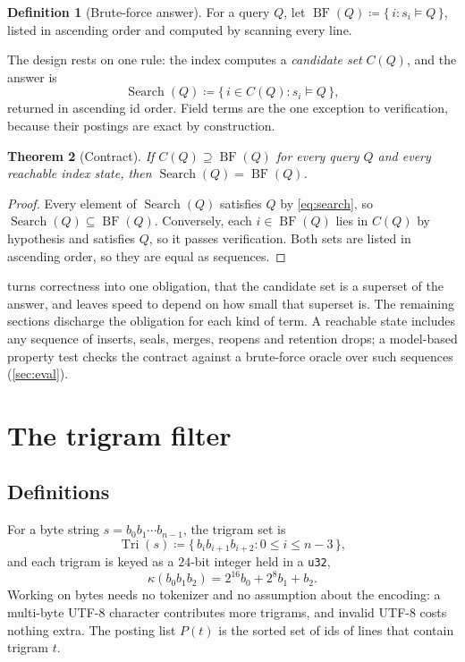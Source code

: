 \documentclass[11pt]{article}
\theoremstyle{plain}
\newtheorem{theorem}{Theorem}[section]
\theoremstyle{definition}
\newtheorem{definition}[theorem]{Definition}
\theoremstyle{remark}
\newcommand{\Tri}{\operatorname{Tri}}
\newcommand{\BF}{\operatorname{BF}}
\newcommand{\Search}{\operatorname{Search}}
\newcommand{\code}[1]{\texttt{#1}}
\begin{document}
\begin{definition}[Brute-force answer]\label{def:bf}
For a query $Q$, let $\BF(Q) \coloneqq \{\, i : s_i \models Q \,\}$, listed in
ascending order and computed by scanning every line.
\end{definition}

The design rests on one rule: the index computes a \emph{candidate set}
$C(Q)$, and the answer is
\begin{equation}\label{eq:search}
  \Search(Q) \coloneqq \{\, i \in C(Q) : s_i \models Q \,\},
\end{equation}
returned in ascending id order. Field terms are the one exception to
verification, because their postings are exact by construction.

\begin{theorem}[Contract]\label{thm:contract}
If $C(Q) \supseteq \BF(Q)$ for every query $Q$ and every reachable index state,
then $\Search(Q) = \BF(Q)$.
\end{theorem}

\begin{proof}
Every element of $\Search(Q)$ satisfies $Q$ by \cref{eq:search}, so
$\Search(Q) \subseteq \BF(Q)$. Conversely, each $i \in \BF(Q)$ lies in $C(Q)$ by
hypothesis and satisfies $Q$, so it passes verification. Both sets are listed in
ascending order, so they are equal as sequences.
\end{proof}

 turns correctness into one obligation, that the candidate
set is a superset of the answer, and leaves speed to depend on how small that
superset is. The remaining sections discharge the obligation for each kind of
term. A reachable state includes any sequence of inserts, seals, merges,
reopens and retention drops; a model-based property test checks the contract
against a brute-force oracle over such sequences (\cref{sec:eval}).

\section{The trigram filter}\label{sec:trigram}

\subsection{Definitions}

For a byte string $s = b_0 b_1 \cdots b_{n-1}$, the trigram set is
\begin{equation}
  \Tri(s) \coloneqq \{\, b_i b_{i+1} b_{i+2} : 0 \le i \le n - 3 \,\},
\end{equation}
and each trigram is keyed as a $24$-bit integer held in a \code{u32},
\begin{equation}
  \kappa(b_0 b_1 b_2) = 2^{16} b_0 + 2^{8} b_1 + b_2 .
\end{equation}
Working on bytes needs no tokenizer and no assumption about the encoding: a
multi-byte UTF-8 character contributes more trigrams, and invalid UTF-8 costs
nothing extra. The posting list $P(t)$ is the sorted set of ids of lines that
contain trigram $t$.
\end{document}
